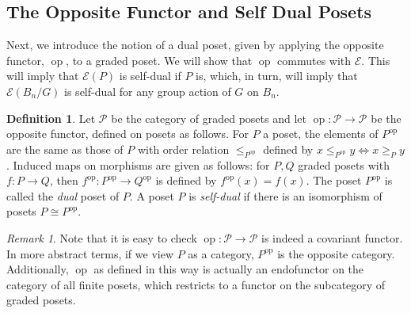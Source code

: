 \documentclass[smallextended, envcountsame, numbook]{svjour3}
\theoremstyle{plain}
\theoremstyle{definition}
\newtheorem{defn}[thm]{Definition}
\theoremstyle{remark}
\newtheorem{rmk}[thm]{Remark}
\numberwithin{equation}{section}
\newcommand\ssec{\subsection}
\renewcommand{\iff}{\Leftrightarrow}
\newcommand\op{\operatorname{op}}
\begin{document}
\ssec{The Opposite Functor and Self Dual Posets}
\label{ssec:dual_posets}

Next, we introduce the notion of a dual poset, given by applying the opposite functor, $\op$, to a graded poset. We will show that $\op$ commutes with $\mathcal E$. This will imply that $\mathcal E(P)$ is self-dual if $P$ is, which, in turn, will imply that $\mathcal E(B_n/G)$ is self-dual for any group action of $G$ on $B_n$.

\begin{defn}
Let $\mathcal P$ be the category of graded posets and let $\op\colon\mathcal P \rightarrow \mathcal P$ be the opposite functor, defined on posets as follows. For $P$ a poset, the elements of $P^{\op}$ are the same as those of $P$ with order relation $\le_{P^{\op}}$ defined by $x \leq_{P^{\op}} y \iff x \geq_P y$. Induced maps on morphisms are given as follows: for $P,Q$ graded posets with $f\colon P \rightarrow Q$, then $f^{\op}\colon P^{\op} \rightarrow Q^{\op}$ is defined by $f^{\op}(x) = f(x)$. The poset $P^{\op}$ is called the {\it dual} poset of $P$. A poset $P$ is {\it self-dual} if there is an isomorphism of posets $P \cong P^{\op}$.
\end{defn}

\begin{rmk}
Note that it is easy to check $\op\colon\mathcal P \rightarrow \mathcal P$ is indeed a covariant functor. In more abstract terms, if we view $P$ as a category, $P^{\op}$ is the opposite category. Additionally, $\op$ as defined in this way is actually an endofunctor on the category of all finite posets, which restricts to a functor on the subcategory of graded posets.
\end{rmk}
\end{document}
